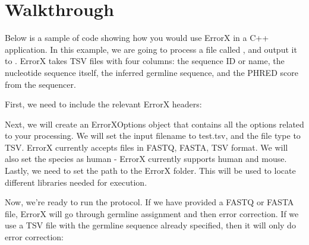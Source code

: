\documentclass[letterpaper,10pt,english]{sphinxmanual}
\begin{document}
\section{Walkthrough}
\label{\detokenize{index:walkthrough}}
Below is a sample of code showing how you would use ErrorX in a C++ application. In this example, we are going to process a file called , and output it to . ErrorX takes TSV files with four columns: the sequence ID or name, the nucleotide sequence itself, the inferred germline sequence, and the PHRED score from the sequencer.

First, we need to include the relevant ErrorX headers:

\begin{sphinxVerbatim}[commandchars=\\\{\}]
\end{sphinxVerbatim}

Next, we will create an ErrorXOptions object that contains all the options related to your processing. We will set the input filename to test.tsv, and the file type to TSV. ErrorX currently accepts files in FASTQ, FASTA, TSV format. We will also set the species as human - ErrorX currently supports human and mouse. Lastly, we need to set the path to the ErrorX folder. This will be used to locate different libraries needed for execution.

\begin{sphinxVerbatim}[commandchars=\\\{\}]
    
  
  
  
\end{sphinxVerbatim}

Now, we’re ready to run the protocol. If we have provided a FASTQ or FASTA file, ErrorX will go through germline assignment and then error correction. If we use a TSV file with the germline sequence already specified, then it will only do error correction:
\end{document}
